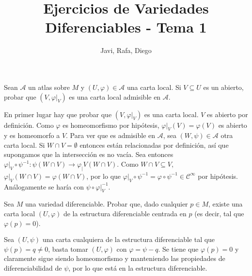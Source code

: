 \documentclass[twoside]{article}
\begin{document}
\title{Ejercicios de Variedades Diferenciables - Tema 1}
\author{Javi, Rafa, Diego}
\maketitle



\begin{ejercicio}{1}\label{1}
Sean $\mathcal{A}$ un atlas sobre $M$ y $(U,\varphi)\in\mathcal{ A }$ una carta local. Si $V\subseteq U$ es un
abierto, probar que $(V, \varphi|_V )$ es una carta local admisible en $\mathcal{A}$.
\end{ejercicio}
\begin{solucion}
En primer lugar hay que probar que $(V, \varphi|_V )$ es una carta local. $V$ es abierto por definición. Como $\varphi$ es homeomorfismo por hipótesis, $\varphi|_V (V)=\varphi(V)$ es abierto y es homeomorfo a $V$. Para ver que es admisible en $\mathcal{A}$, sea $(W,\psi)\in\mathcal{A}$ otra carta local. Si $W\cap V=\emptyset$ entonces están relacionadas por definición, así que supongamos que la intersección es no vacía. Sea entonces $\varphi|_V\circ\psi^{-1}:\psi(W\cap V)\to\varphi_|V (W\cap V)$. Como $W\cap V\subseteq V$, $\varphi|_V (W\cap V)=\varphi(W\cap V)$, por lo que $\varphi|_V\circ\psi^{-1}=\varphi\circ\psi^{-1}\in\mathcal{C}^\infty$ por hipótesis. Análogamente se haría con $\psi\circ\varphi|_V^{-1}$.
\end{solucion}

\begin{ejercicio}{2}
Sea $M$ una variedad diferenciable. Probar que, dado cualquier $p \in M$, existe
una carta local $(U, \varphi)$ de la estructura diferenciable centrada en $p$ (es decir,
tal que $\varphi(p) = 0$).
\end{ejercicio}
\begin{solucion}
Sea $(U,\psi)$ una carta cualquiera de la estructura diferenciable tal que $\psi(p)=q\neq 0$, basta tomar $(U,\varphi)$ con $\varphi=\psi-q$. Se tiene que $\varphi(p)=0$ y claramente sigue siendo homeomorfismo y manteniendo las propiedades de diferenciabilidad de $\psi$, por lo que está en la estructura diferenciable.
\end{solucion}
\end{document}
